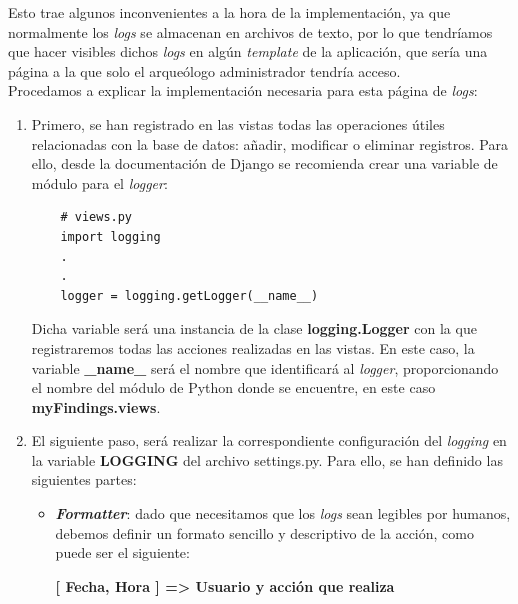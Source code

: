 Esto trae algunos inconvenientes a la hora de la implementación, ya que normalmente los
\textit{logs} se almacenan en archivos de texto, por lo que tendríamos que hacer visibles
dichos \textit{logs} en algún \textit{template} de la aplicación, que sería una página a la
que solo el arqueólogo administrador tendría acceso. \\

Procedamos a explicar la implementación necesaria para esta página de \textit{logs}:

    \begin{enumerate}
        \item Primero, se han registrado en las vistas todas las operaciones útiles
        relacionadas con la base de datos: añadir, modificar o eliminar registros. Para
        ello, desde la documentación de Django se recomienda crear una variable de módulo
        para el \textit{logger}:

    
    \begin{verbatim}
    # views.py
    import logging
    .
    .
    logger = logging.getLogger(__name__)
    \end{verbatim}

        Dicha variable será una instancia de la clase \textbf{logging.Logger} con la que
        registraremos todas las acciones realizadas en las vistas. En este caso, la variable
        \textbf{\_name\_} será el nombre que identificará al \textit{logger},
        proporcionando el nombre del módulo de Python donde se encuentre, en este caso
        \textbf{myFindings.views}.
        
        \item El siguiente paso, será realizar la correspondiente configuración del
        \textit{logging} en la variable \textbf{LOGGING} del archivo settings.py. Para
        ello, se han definido las siguientes partes:

            \begin{itemize}
                \item \textbf{\textit{Formatter}}: dado que necesitamos que los \textit{logs}
                sean legibles por humanos, debemos definir un formato sencillo y
                descriptivo de la acción, como puede ser el siguiente:
                \begin{center}
                    \textbf{[ Fecha, Hora ] => Usuario y acción que realiza} 
                \end{center}


\end{itemize}
\end{enumerate}
